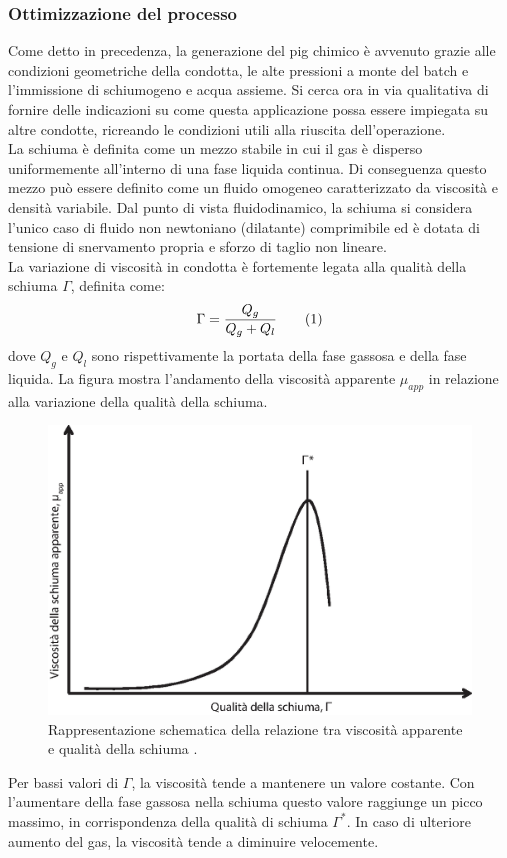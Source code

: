\subsubsection*{Ottimizzazione del processo}
Come detto in precedenza, la generazione del pig chimico è avvenuto grazie alle condizioni geometriche della condotta, le alte pressioni a monte del batch e l'immissione di schiumogeno e acqua assieme. Si cerca ora in via qualitativa di fornire delle indicazioni su come questa applicazione possa essere impiegata su altre condotte, ricreando le condizioni utili alla riuscita dell'operazione.\\
La schiuma \parencite{karam2013foam} è definita come un mezzo stabile in cui il gas è disperso uniformemente all'interno di una fase liquida continua. Di conseguenza questo mezzo può essere definito come un fluido omogeneo caratterizzato da viscosità e densità variabile. Dal punto di vista fluidodinamico, la schiuma si considera l'unico caso di fluido non newtoniano (dilatante) comprimibile ed è dotata di tensione di snervamento propria e sforzo di taglio non lineare.\\
La variazione di viscosità in condotta è fortemente legata alla qualità della schiuma \(\Gamma\), definita come:
\[\Gamma=\dfrac{Q_g}{Q_g+Q_l} \addtag \]
dove \(Q_g\) e \(Q_l\) sono rispettivamente la portata della fase gassosa e della fase liquida. La figura  mostra l'andamento della viscosità apparente \(\mu_{app}\) in relazione alla variazione della qualità della schiuma.
\begin{figure}[htbp]
    \centering
    \includegraphics[width=.6\textwidth]{fig/test/foam-viscosita.eps}
    \caption{Rappresentazione schematica della relazione tra viscosità apparente e qualità della schiuma \parencite{gajbhiye2011characterization}.} 
    \label{fig:foam-viscosita}
\end{figure}
Per bassi valori di \(\Gamma\), la viscosità tende a mantenere un valore costante. Con l'aumentare della fase gassosa nella schiuma questo valore raggiunge un picco massimo, in corrispondenza della qualità di schiuma \(\Gamma^{*}\). In caso di ulteriore aumento del gas, la viscosità tende a diminuire velocemente.\\
